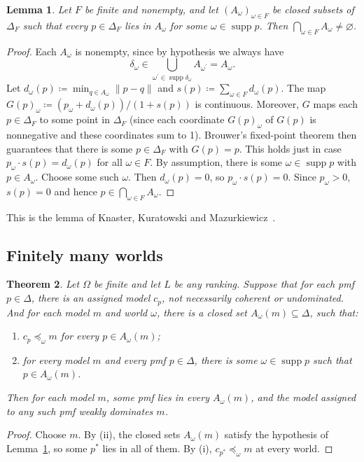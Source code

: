 \documentclass[11pt]{article}
\newtheorem{theorem}{Theorem}[section]
\newtheorem{lemma}[theorem]{Lemma}
\theoremstyle{definition}
\newcommand{\supp}{\operatorname{supp}}
\begin{document}
\begin{lemma}\label{lem:kkm}
Let $F$ be finite and nonempty, and let $(A_\omega)_{\omega\in F}$ be closed subsets of $\Delta_F$ such that every $p\in\Delta_F$ lies in $A_\omega$ for some $\omega\in\supp p$. Then $\bigcap_{\omega\in F}A_\omega\ne\varnothing$.
\end{lemma}
\begin{proof}
Each $A_\omega$ is nonempty, since by hypothesis we always have 
\[
\delta_\omega\in\bigcup_{\omega^\prime\in\supp \delta_\omega}A_{\omega^\prime}=A_\omega.
\]
Let $d_\omega(p)\coloneqq\min_{q\in A_\omega}\lVert p-q \rVert$ and $s(p)\coloneqq\sum_{\omega\in F} d_\omega(p)$. The map $G(p)_\omega\coloneqq(p_\omega+d_\omega(p))/(1+s(p))$ is continuous. Moreover, $G$ maps each $p\in\Delta_F$ to some point in $\Delta_F$ (since each coordinate $G(p)_\omega$ of $G(p)$ is nonnegative and these coordinates sum to 1). Brouwer's fixed-point theorem then guarantees that there is some $p\in\Delta_F$ with $G(p)=p$. This holds just in case $p_\omega\cdot s(p)=d_\omega(p)$ for all $\omega\in F$. By assumption, there is some $\omega\in\supp p$ with $p\in A_\omega$. Choose some such $\omega$. Then $d_\omega(p)=0$, so $p_\omega\cdot s(p)=0$. Since $p_\omega>0$, $s(p)=0$ and hence $p\in\bigcap_{\omega\in F}A_\omega$.
\end{proof}

This is the lemma of Knaster, Kuratowski and Mazurkiewicz~\cite{KKM}.




\subsection{Finitely many worlds}
\begin{theorem}\label{thm:finite}
Let $\Omega$ be finite and let $L$ be any ranking. Suppose that for each pmf $p\in\Delta$, there is an assigned model $c_p$, not necessarily coherent or undominated. And for each model $m$ and world $\omega$, there is a closed set $A_\omega(m)\subseteq\Delta$, such that:
\begin{enumerate}[label=(\roman*)]
\item $c_p\preceq_\omega m$ for every $p\in A_\omega(m)$;
\item for every model $m$ and every pmf $p\in\Delta$, there is some $\omega\in\supp p$ such that $p\in A_\omega(m)$.
\end{enumerate}
Then for each model $m$, some pmf lies in every $A_\omega(m)$, and the model assigned to any such pmf weakly dominates $m$.
\end{theorem}
\begin{proof}
Choose $m$. By (ii), the closed sets $A_\omega(m)$ satisfy the hypothesis of Lemma~\ref{lem:kkm}, so some $p^*$ lies in all of them. By (i), $c_{p^*}\preceq_\omega m$ at every world.
\end{proof}
\end{document}
